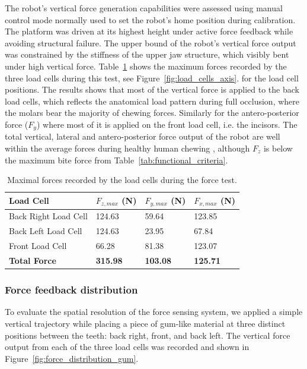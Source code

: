The robot's vertical force generation capabilities were assessed using manual control mode normally used to set the robot's home position during calibration. 
The platform was driven at its highest height under active force feedback while avoiding structural failure. The upper bound of the robot's vertical force 
output was constrained by the stiffness of the upper jaw structure, which visibly bent under high vertical force. Table~\ref{tab:max_force} shows the 
maximum forces recorded by the three load cells during this test, see Figure~\ref{fig:load_cells_axis}.
for the load cell positions. The results shows that most of the vertical force is applied to the back load cells, which reflects the 
anatomical load pattern during full occlusion, where the molars bear the majority of chewing forces. Similarly for the antero-posterior force ($F_y$) where most of it 
is applied on the front load cell, i.e. the incisors. The total vertical, lateral and antero-posterior force output of the robot are well within the average 
forces during healthy human chewing \cite{shear_force}, although $F_z$ is below the maximum bite force from Table~\ref{tab:functional_criteria}.
\begin{table}[H]
    \centering
    \begin{tabular}{p{4cm} p{2cm} p{2cm} p{2cm}}
        \toprule
        \textbf{Load Cell} & \textbf{$F_{z,max}$ (N)} & \textbf{$F_{y,max}$ (N)} & \textbf{$F_{x,max}$ (N)} \\
        \midrule
        Back Right Load Cell & 124.63 & 59.64 & 123.85 \\
        Back Left Load Cell & 124.63 & 23.95 & 67.84  \\
        Front Load Cell & 66.28 & 81.38 & 123.07  \\
        \midrule
        \textbf{Total Force} & \textbf{315.98} & \textbf{103.08} & \textbf{125.71} \\
        \bottomrule       
    \end{tabular}
    \caption{Maximal forces recorded by the load cells during the force test.}
    \label{tab:max_force}
\end{table}

\subsubsection{Force feedback distribution}

To evaluate the spatial resolution of the force sensing system, we applied a simple vertical trajectory while placing a piece of gum-like material 
at three distinct positions between the teeth: back right, front, and back left. The vertical force output from each of the three load cells was 
recorded and shown in Figure~\ref{fig:force_distribution_gum}.

